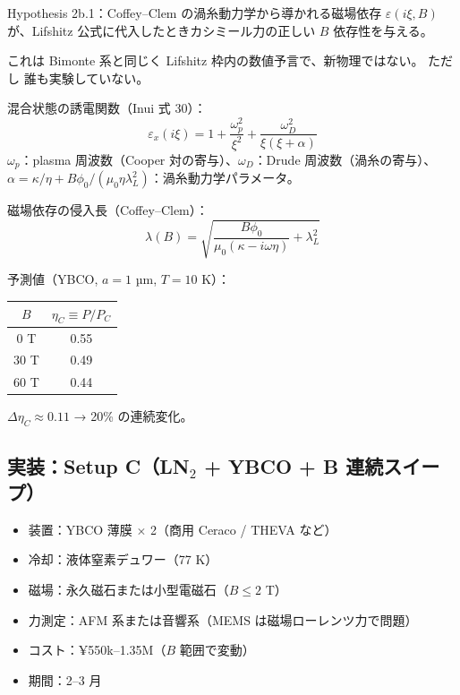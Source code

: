 \documentclass[11pt,a4paper]{article}
\def\textbf#1{#1}%
\begin{document}
\begin{hypothesisbox}
\textbf{Hypothesis 2b.1}：Coffey--Clem の渦糸動力学から導かれる磁場依存
$\varepsilon(i\xi, B)$ が、Lifshitz 公式に代入したときカシミール力の正しい
$B$ 依存性を与える。

これは Bimonte 系と同じく Lifshitz 枠内の数値予言で、新物理ではない。
ただし \textbf{誰も実験していない}。
\end{hypothesisbox}

\begin{theorybox}
\textbf{混合状態の誘電関数（Inui 式 30）}：
\[
  \varepsilon_x(i\xi) = 1 + \frac{\omega_p^2}{\xi^2} + \frac{\omega_D^2}{\xi(\xi+\alpha)}
\]
$\omega_p$：plasma 周波数（Cooper 対の寄与）、$\omega_D$：Drude 周波数（渦糸の寄与）、
$\alpha = \kappa/\eta + B\phi_0/(\mu_0 \eta \lambda_L^2)$：渦糸動力学パラメータ。

\textbf{磁場依存の侵入長（Coffey--Clem）}：
\[
  \lambda(B) = \sqrt{\frac{B\phi_0}{\mu_0(\kappa - i\omega\eta)} + \lambda_L^2}
\]

\textbf{予測値（YBCO, $a = 1$ µm, $T = 10$ K）}：
\begin{center}
\begin{tabular}{cc}
\toprule
$B$ & $\eta_C \equiv P/P_C$ \\
\midrule
0    T & 0.55 \\
30   T & 0.49 \\
60   T & 0.44 \\
\bottomrule
\end{tabular}
\end{center}
$\Delta\eta_C \approx 0.11$ → \textbf{20\% の連続変化}。
\end{theorybox}

\subsection{実装：Setup C（LN$_2$ + YBCO + B 連続スイープ）}

\begin{itemize}
\item 装置：YBCO 薄膜 $\times$ 2（商用 Ceraco / THEVA など）
\item 冷却：液体窒素デュワー（77 K）
\item 磁場：永久磁石または小型電磁石（$B \leq 2$ T）
\item 力測定：AFM 系または音響系（MEMS は磁場ローレンツ力で問題）
\item コスト：\textbf{¥550k--1.35M}（$B$ 範囲で変動）
\item 期間：2--3 月
\end{itemize}
\end{document}

